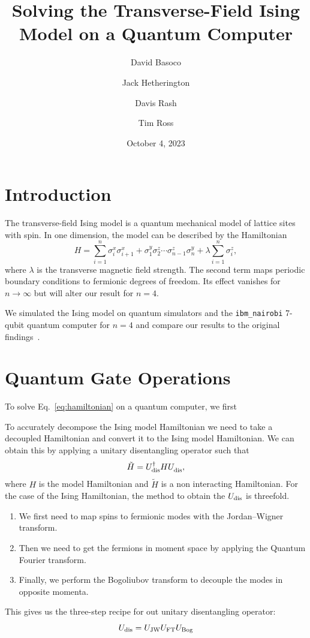 \documentclass[12pt]{article}
\title{Solving the Transverse-Field Ising Model on a Quantum Computer}
\author{David Basoco \and Jack Hetherington \and Davis Rash \and Tim Ross}
\date{October 4, 2023}
\begin{document}
  \maketitle

  \section{Introduction}
  The transverse-field Ising model is a quantum mechanical model of lattice sites with spin. In one dimension, the model can be described by the Hamiltonian
  \begin{equation}
    \label{eq:hamiltonian}
    H = \sum_{i = 1}^{n} \sigma_{i}^{x} \sigma_{i + 1}^{x}
        + \sigma_{1}^{y} \sigma_{2}^{z} \dotsm \sigma_{n - 1}^{z} \sigma_{n}^{y}
        + \lambda \sum_{i = 1}^{n} \sigma_{i}^{z},
  \end{equation}
  where \( \lambda \) is the transverse magnetic field strength. The second term maps periodic boundary conditions to fermionic degrees of freedom. Its effect vanishes for \( n \to \infty \) but will alter our result for \( n = 4 \).

  We simulated the Ising model on quantum simulators and the \texttt{ibm\_nairobi} 7-qubit quantum computer for \( n = 4 \) and compare our results to the original findings~\cite{Cervera18}.

  \section{Quantum Gate Operations}
  To solve Eq.~\eqref{eq:hamiltonian} on a quantum computer, we first

  To accurately decompose the Ising model Hamiltonian we need to take a decoupled Hamiltonian and convert it to the Ising model Hamiltonian. We can obtain this by applying a unitary disentangling operator such that
  \begin{equation}
    \tilde{H}
      = U_{\textnormal{dis}}^{\dagger} H
        U_{\textnormal{dis}}^{\vphantom{\dagger}},
  \end{equation}
  where \( H \) is the model Hamiltonian and \( \tilde{H} \) is a non interacting Hamiltonian. For the case of the Ising Hamiltonian, the method to obtain the \( U_{\textnormal{dis}} \) is threefold.
  \begin{enumerate}
   \item We first need to map spins to fermionic modes with the Jordan--Wigner transform.
   \item Then we need to get the fermions in moment space by applying the Quantum Fourier transform.
   \item Finally, we perform the Bogoliubov transform to decouple the modes in opposite momenta.
  \end{enumerate}
  This gives us the three-step recipe for out unitary disentangling operator:
  \begin{equation}
    U_{\textnormal{dis}}
      = U_{\textnormal{JW}} U_{\textnormal{FT}} U_{\textnormal{Bog}}
  \end{equation}
\end{document}
